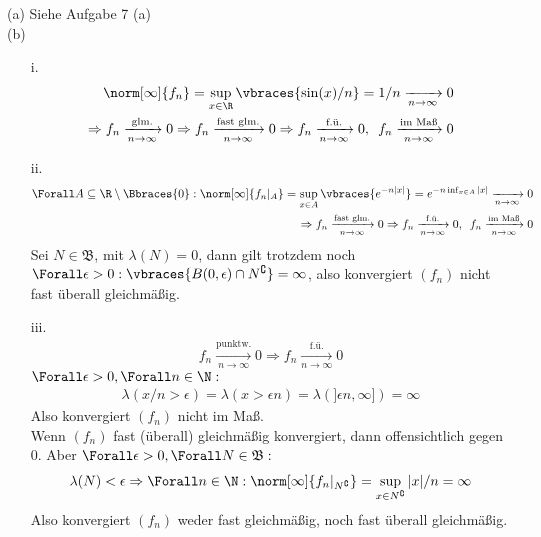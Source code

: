 \begin{solution}

(a) Siehe Aufgabe 7 (a) \\

(b) \phantom{}

\begin{itemize}

  \item[i.]
  \begin{align*}
     \norm[\infty]{f_n}
     =
     \sup_{x \in \R} \vbraces{\sin(x)/n}
     =
     1/n
     \xrightarrow[n \to \infty]{} 0 \\
     \Rightarrow
     f_n \xrightarrow[n \to \infty]{\text{glm.}} 0
     \Rightarrow
     f_n \xrightarrow[n \to \infty]{\text{fast glm.}} 0
     \Rightarrow
     f_n \xrightarrow[n \to \infty]{\text{f.ü.}} 0,
     \enspace
     f_n \xrightarrow[n \to \infty]{\text{im Maß}} 0
   \end{align*}

  \item[ii.]
  \begin{align*}
    \Forall A \subseteq \R \setminus \Bbraces{0}:
    \norm[\infty]{f_n|_A}
    =
    \sup_{x \in A} \vbraces{e^{-n |x|}}
    =
    e^{-n \inf_{x \in A} |x|}
    \xrightarrow[n \to \infty]{} 0 \\
    \Rightarrow
    f_n \xrightarrow[n \to \infty]{\text{fast glm.}} 0
    \Rightarrow
    f_n \xrightarrow[n \to \infty]{\text{f.ü.}} 0,
    \enspace
    f_n \xrightarrow[n \to \infty]{\text{im Maß}} 0
  \end{align*}
  Sei $N \in \mathfrak{B}$, mit $\lambda(N) = 0$, dann gilt trotzdem noch $\Forall \epsilon > 0: \vbraces{B(0, \epsilon) \cap N^\complement} = \infty$, also konvergiert $(f_n)$ nicht fast überall gleichmäßig.

  \item[iii.]
  \begin{align*}
    f_n \xrightarrow[n \to \infty]{\text{punktw.}} 0
    \Rightarrow
    f_n \xrightarrow[n \to \infty]{\text{f.ü.}} 0
  \end{align*}
  $\Forall \epsilon > 0, \Forall n \in \N:$
  \begin{align*}
    \lambda(x/n > \epsilon)
    =
    \lambda(x > \epsilon n)
    =
    \lambda(]\epsilon n, \infty])
    =
    \infty
  \end{align*}
  Also konvergiert $(f_n)$ nicht im Maß. \\
  Wenn $(f_n)$ fast (überall) gleichmäßig konvergiert, dann offensichtlich gegen $0$. Aber $\Forall \epsilon > 0, \Forall N \in \mathfrak{B}:$
  \begin{align*}
    \lambda(N) < \epsilon
    \Rightarrow
    \Forall n \in \N:
    \norm[\infty]{f_n|_{N^\complement}}
    =
    \sup_{x \in N^\complement} |x|/n
    =
    \infty
  \end{align*}
  Also konvergiert $(f_n)$ weder fast gleichmäßig, noch fast überall gleichmäßig. \\


\end{itemize}
\end{solution}
